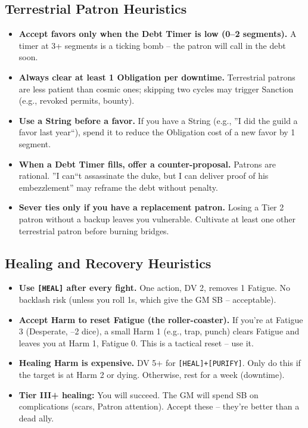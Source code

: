 \documentclass[11pt]{article}
\begin{document}
\subsection*{Terrestrial Patron Heuristics}
\begin{itemize}
  \item \textbf{Accept favors only when the Debt Timer is low (0--2 segments).} A timer at 3+ segments is a ticking bomb -- the patron will call in the debt soon.
  \item \textbf{Always clear at least 1 Obligation per downtime.} Terrestrial patrons are less patient than cosmic ones; skipping two cycles may trigger Sanction (e.g., revoked permits, bounty).
  \item \textbf{Use a String before a favor.} If you have a String (e.g., ''I did the guild a favor last year``), spend it to reduce the Obligation cost of a new favor by 1 segment.
  \item \textbf{When a Debt Timer fills, offer a counter-proposal.} Patrons are rational. ''I can``t assassinate the duke, but I can deliver proof of his embezzlement'' may reframe the debt without penalty.
  \item \textbf{Sever ties only if you have a replacement patron.} Losing a Tier 2 patron without a backup leaves you vulnerable. Cultivate at least one other terrestrial patron before burning bridges.
\end{itemize}

\subsection*{Healing and Recovery Heuristics}

\begin{itemize}
    \item \textbf{Use \texttt{[HEAL]} after every fight.} One action, DV 2, removes 1 Fatigue. No backlash risk (unless you roll 1s, which give the GM SB -- acceptable).
    \item \textbf{Accept Harm to reset Fatigue (the roller-coaster).} If you're at Fatigue 3 (Desperate, --2 dice), a small Harm 1 (e.g., trap, punch) clears Fatigue and leaves you at Harm 1, Fatigue 0. This is a tactical reset -- use it.
    \item \textbf{Healing Harm is expensive.} DV 5+ for \texttt{[HEAL]+[PURIFY]}. Only do this if the target is at Harm 2 or dying. Otherwise, rest for a week (downtime).
    \item \textbf{Tier III+ healing:} You will succeed. The GM will spend SB on complications (scars, Patron attention). Accept these -- they're better than a dead ally.
\end{itemize}
\end{document}
